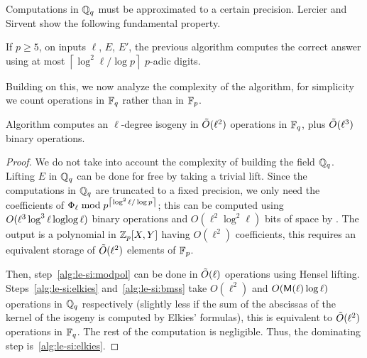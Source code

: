 Computations in $\mathbb{Q}_q$ must be approximated to a certain
precision. Lercier and Sirvent show the following fundamental
property.

\begin{proposition}
  \label{th:ls-diffeq}
  If $p\ge5$, on inputs $\ell$, $E$, $E'$, the previous algorithm
  computes the correct answer using at most
  $\left\lceil\log^2\ell/\log p\right\rceil$ $p$-adic digits.
\end{proposition}

Building on this, we now analyze the complexity of the algorithm, for
simplicity we count operations in $\mathbb{F}_q$ rather than in $\mathbb{F}_p$.

\begin{proposition}
  \label{th:lercier-sirvent}
  Algorithm  computes an $\ell$-degree isogeny in
  $\tilde{O}(\ell^2)$ operations in $\mathbb{F}_q$, plus $\tilde{O}(\ell^3)$ binary
  operations.
\end{proposition}
\begin{proof}
  We do not take into account the complexity of building the field
  $\mathbb{Q}_q$. Lifting $E$ in $\mathbb{Q}_q$ can be done for free by taking a
  trivial lift. Since the computations in $\mathbb{Q}_q$ are truncated to a
  fixed precision, we only need the coefficients of $\Phi_\ell\bmod
  p^{\left\lceil\log^2\ell/\log p\right\rceil}$; this can be computed
  using $O(\ell^3\log^3\ell\operatorname{loglog}\ell)$ binary operations and
  $O(\ell^2\log^2\ell)$ bits of space by
  \cite[Algorithm~6.1]{sutherland10:modpol}. The output is a
  polynomial in $\mathbb{Z}_p[X,Y]$ having $O(\ell^2)$ coefficients, this
  requires an equivalent storage of $\tilde{O}(\ell^2)$ elements of
  $\mathbb{F}_p$.

  Then, step~\ref{alg:le-si:modpol} can be done in $\tilde{O}(\ell)$
  operations using Hensel lifting. Steps~\ref{alg:le-si:elkies}
  and~\ref{alg:le-si:bmss} take $O(\ell^2)$ and
  $O(\mathsf{M}(\ell)\log\ell)$ operations in $\mathbb{Q}_q$ respectively (slightly
  less if the sum of the abscissas of the kernel of the isogeny is
  computed by Elkies' formulas), this is equivalent to
  $\tilde{O}(\ell^2)$ operations in $\mathbb{F}_q$. The rest of the computation
  is negligible. Thus, the dominating step is~\ref{alg:le-si:elkies}.
\end{proof}

